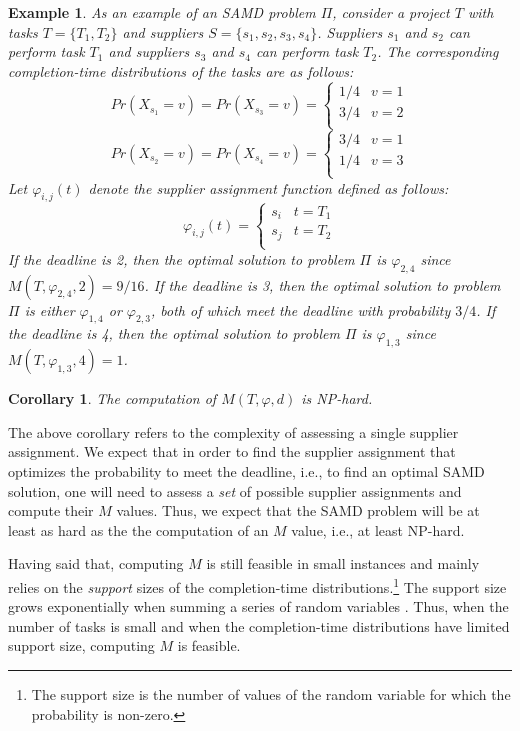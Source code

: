 \documentclass[letterpaper]{article} %
\newtheorem{corollary}{Corollary}
\newtheorem{example}{Example}
\newcommand{\samd}{\ac{SAMD}\xspace}
\begin{document}
\begin{example}
As an example of an \samd problem $\Pi$, consider a project $T$ with tasks $T=\{T_1, T_2\}$ and suppliers $S=\{s_1, s_2, s_3, s_4\}$.
Suppliers $s_1$ and $s_2$ can perform task $T_1$
and suppliers $s_3$ and $s_4$ can perform task $T_2$.
The corresponding completion-time distributions of the tasks are as follows:
\[ Pr(X_{s_1}=v)=Pr(X_{s_3}=v)=
\begin{cases}
      1/4 & v=1\\
      3/4 & v=2\\
\end{cases}
\]
\[ Pr(X_{s_2}=v)=Pr(X_{s_4}=v)=
\begin{cases}
      3/4 & v=1\\
      1/4 & v=3\\
\end{cases}
\]
Let $\varphi_{i,j}(t)$ denote the supplier assignment function defined as follows:
\[\varphi_{i,j}(t)=
\begin{cases}
      s_i & t=T_1\\
      s_j & t=T_2\\
\end{cases}\]
If the deadline is 2, then the optimal solution to problem $\Pi$ is $\varphi_{2,4}$
since $M(T, \varphi_{2,4}, 2)=9/16$.
If the deadline is 3, then the optimal solution to problem $\Pi$ is either $\varphi_{1,4}$
or $\varphi_{2,3}$, both of which meet the deadline with probability $3/4$. If the deadline is 4, then the optimal solution to problem $\Pi$ is $\varphi_{1,3}$  since $M(T, \varphi_{1,3}, 4)=1$.
\end{example}







\begin{corollary}
The computation of $M(T, \varphi, d)$ is NP-hard.
\label{cor:m}
\end{corollary}
The above corollary refers to the complexity of assessing a single supplier assignment. We expect that in order to find the supplier assignment that optimizes the probability to meet the deadline, i.e., to find an optimal \samd solution, one will need to assess a \emph{set} of possible supplier assignments and compute their $M$ values. Thus, we expect that the \samd problem will be at least as hard as the the computation of an $M$ value, i.e., at least NP-hard.



Having said that, computing $M$ is still feasible in small instances and mainly relies on the \emph{support} sizes of the completion-time distributions.\footnote{The support size is the number of values of the random variable for which the probability is non-zero.} The support size grows exponentially when summing a series of random variables \cite{cohen2015estimating}. Thus, when the number of tasks is small and when the completion-time distributions have limited support size, computing $M$ is feasible.
\end{document}
